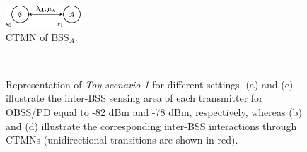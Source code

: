 \documentclass{article}
\begin{document}
\begin{figure}[h!!!!]	
	\centering
	\includegraphics[width=0.25\textwidth]{ctmn}
	\caption{CTMN of $\text{BSS}_A$.} 
	\label{fig:ctmn}
\end{figure}

\begin{figure}[h!]
	\centering
	\hspace{1cm}
	\\
	\hspace{1cm}
	\caption{Representation of \emph{Toy scenario 1} for different settings. (a) and (c) illustrate the inter-BSS sensing area of each transmitter for OBSS/PD equal to -82 dBm and -78 dBm, respectively, whereas (b) and (d) illustrate the corresponding inter-BSS interactions through CTMNs (unidirectional transitions are shown in red).}
	\label{fig:toy_scenario_1b}
\end{figure}
\end{document}
